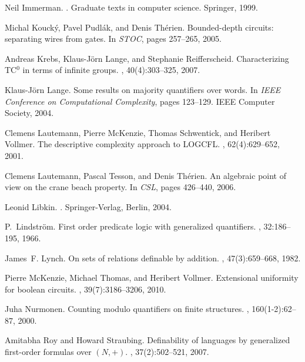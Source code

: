 \documentclass[envcountsame]{llncs}
\begin{document}
\begin{thebibliography}{10}
Neil Immerman.
.
\newblock Graduate texts in computer science. Springer, 1999.

Michal Kouck{\'y}, Pavel Pudl{\'a}k, and Denis Th{\'e}rien.
\newblock Bounded-depth circuits: separating wires from gates.
\newblock In {\em STOC}, pages 257--265, 2005.

Andreas Krebs, Klaus-J{\"o}rn Lange, and Stephanie Reifferscheid.
\newblock Characterizing {TC}$^{\mbox{0}}$ in terms of infinite groups.
, 40(4):303--325, 2007.

Klaus-J{\"o}rn Lange.
\newblock Some results on majority quantifiers over words.
\newblock In {\em IEEE Conference on Computational Complexity}, pages 123--129.
  IEEE Computer Society, 2004.

Clemens Lautemann, Pierre McKenzie, Thomas Schwentick, and Heribert Vollmer.
\newblock The descriptive complexity approach to {LOGCFL}.
, 62(4):629--652, 2001.

Clemens Lautemann, Pascal Tesson, and Denis Th{\'e}rien.
\newblock An algebraic point of view on the crane beach property.
\newblock In {\em CSL}, pages 426--440, 2006.

Leonid Libkin.
.
\newblock Springer-Verlag, Berlin, 2004.

P.~Lindstr{\"o}m.
\newblock First order predicate logic with generalized quantifiers.
, 32:186--195, 1966.

James~F. Lynch.
\newblock On sets of relations definable by addition.
, 47(3):659--668, 1982.

Pierre McKenzie, Michael Thomas, and Heribert Vollmer.
\newblock Extensional uniformity for boolean circuits.
, 39(7):3186--3206, 2010.

Juha Nurmonen.
\newblock Counting modulo quantifiers on finite structures.
, 160(1-2):62--87, 2000.

Amitabha Roy and Howard Straubing.
\newblock Definability of languages by generalized first-order formulas over
  {$(N,+)$}.
, 37(2):502--521, 2007.


\end{thebibliography}
\end{document}
